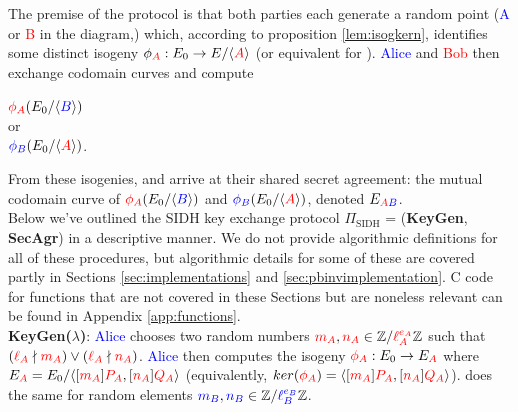 \begin{center}
\end{center}

The premise of the protocol is that both parties each generate a random point (\textcolor{blue}{A} or \textcolor{red}{B} in the diagram,) which, according to proposition \ref{lem:isogkern}, identifies some distinct isogeny $\phi_{\textcolor{red}{A}}: E_0 \rightarrow E/ \langle \textcolor{red}{A} \rangle$ (or equivalent for \rb). \textcolor{blue}{Alice} and \textcolor{red}{Bob} then exchange codomain curves and compute
\begin{center}
$\textcolor{red}{\phi_A}(E_0/\langle \textcolor{blue}{B} \rangle)$\\
$\text{or}$\\
$\textcolor{blue}{\phi_B}(E_0/\langle \textcolor{red}{A} \rangle)$.
\end{center}

From these isogenies, \alice and \bob arrive at their shared secret agreement: the mutual codomain curve of $\textcolor{red}{\phi_A}(E_0/\langle \textcolor{blue}{B} \rangle)$ and $\textcolor{blue}{\phi_B}(E_0/\langle \textcolor{red}{A} \rangle)$, denoted $E_{\textcolor{red}{A}\textcolor{blue}{B}}$.\\

\noindent
Below we've outlined the SIDH key exchange protocol $\Pi_{\text{SIDH}}$ = (\textbf{KeyGen}, \textbf{SecAgr}) in a descriptive manner. We do not provide algorithmic definitions for all of these procedures, but algorithmic details for some of these are covered partly in Sections \ref{sec:implementations} and \ref{sec:pbinvimplementation}. C code for functions that are not covered in these Sections but are noneless relevant can be found in Appendix \ref{app:functions}.\\

\noindent
\textbf{KeyGen($\lambda$)}: \textcolor{blue}{Alice} chooses two random numbers $\textcolor{red}{m_A}, \textcolor{red}{n_A} \in \mathbb{Z}/\textcolor{red}{\ell_{A}^{e_A}}\mathbb{Z}$ such that $(\textcolor{red}{\ell_{A}} \nmid \textcolor{red}{m_A}) \lor (\textcolor{red}{\ell_{A}} \nmid \textcolor{red}{n_A})$. \textcolor{blue}{Alice} then computes the isogeny $\textcolor{red}{\phi_A}: E_0 \rightarrow E_{\textcolor{red}{A}}$ where $E_{\textcolor{red}{A}} = E_0 / \langle [\textcolor{red}{m_A}]\textcolor{red}{P_A}, [\textcolor{red}{n_A}]\textcolor{red}{Q_A}\rangle$ (equivalently, $ker(\textcolor{red}{\phi_A}) = \langle [\textcolor{red}{m_A}]\textcolor{red}{P_A}, [\textcolor{red}{n_A}]\textcolor{red}{Q_A}\rangle$). \bob does the same for random elements $\textcolor{blue}{m_B}, \textcolor{blue}{n_B} \in \mathbb{Z}/\textcolor{blue}{\ell_{B}^{e_B}}\mathbb{Z}$.

